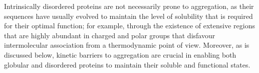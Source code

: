 Intrinsically disordered proteins are not necessarily prone to aggregation, as their sequences have usually evolved to maintain the level
of solubility that is required for their optimal function; for example, through the existence of extensive regions that are highly abundant in charged and polar groups
that disfavour intermolecular association from a thermodynamic point of view. 
Moreover, as is discussed below, kinetic barriers to aggregation are crucial in enabling both globular and disordered proteins to maintain their soluble and functional states.

























% 
% 
% 
% 
% 


% 











